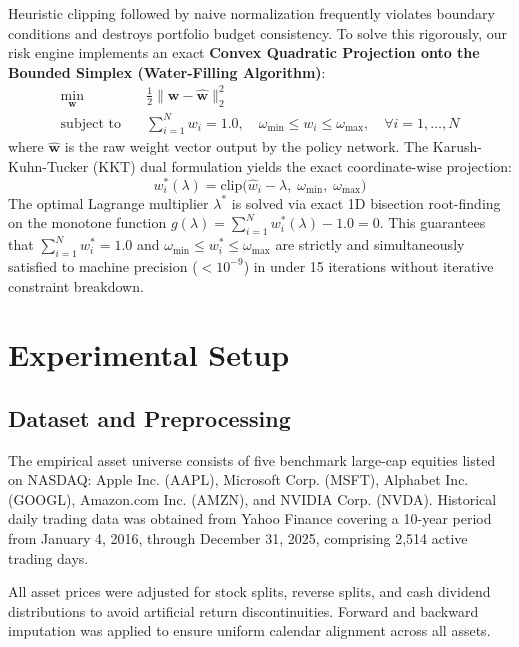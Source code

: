 \documentclass[conference]{IEEEtran}
\begin{document}
Heuristic clipping followed by naive normalization frequently violates boundary conditions and destroys portfolio budget consistency. To solve this rigorously, our risk engine implements an exact \textbf{Convex Quadratic Projection onto the Bounded Simplex (Water-Filling Algorithm)}:
\begin{align}
    \min_{\mathbf{w}} \quad & \frac{1}{2} \|\mathbf{w} - \hat{\mathbf{w}}\|_2^2 \\
    \text{subject to} \quad & \sum_{i=1}^N w_i = 1.0, \quad \omega_{\min} \le w_i \le \omega_{\max}, \quad \forall i=1, \dots, N \nonumber
\end{align}
where $\hat{\mathbf{w}}$ is the raw weight vector output by the policy network. The Karush-Kuhn-Tucker (KKT) dual formulation yields the exact coordinate-wise projection:
\begin{equation}
    w_i^*(\lambda) = \text{clip}\big(\hat{w}_i - \lambda, \; \omega_{\min}, \; \omega_{\max}\big)
\end{equation}
The optimal Lagrange multiplier $\lambda^*$ is solved via exact 1D bisection root-finding on the monotone function $g(\lambda) = \sum_{i=1}^N w_i^*(\lambda) - 1.0 = 0$. This guarantees that $\sum_{i=1}^N w_i^* = 1.0$ and $\omega_{\min} \le w_i^* \le \omega_{\max}$ are strictly and simultaneously satisfied to machine precision ($<10^{-9}$) in under 15 iterations without iterative constraint breakdown.

\section{Experimental Setup}

\subsection{Dataset and Preprocessing}
The empirical asset universe consists of five benchmark large-cap equities listed on NASDAQ: Apple Inc. (AAPL), Microsoft Corp. (MSFT), Alphabet Inc. (GOOGL), Amazon.com Inc. (AMZN), and NVIDIA Corp. (NVDA). Historical daily trading data was obtained from Yahoo Finance covering a 10-year period from January 4, 2016, through December 31, 2025, comprising 2,514 active trading days.

All asset prices were adjusted for stock splits, reverse splits, and cash dividend distributions to avoid artificial return discontinuities. Forward and backward imputation was applied to ensure uniform calendar alignment across all assets.
\end{document}
